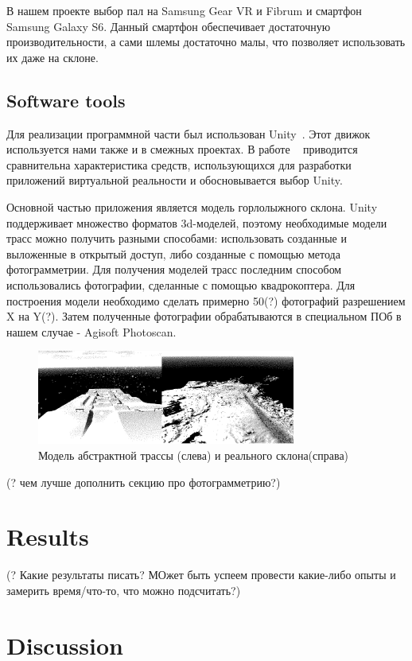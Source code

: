 \documentclass[twoside]{article}
\begin{document}
В нашем проекте выбор пал на Samsung Gear VR и Fibrum и смартфон Samsung Galaxy S6.
Данный смартфон обеспечивает достаточную производительности, а сами шлемы достаточно малы, что позволяет использовать их даже на склоне.

\subsection{Software tools}
Для реализации программной части был использован Unity~\cite{unity3d-bib9}.
Этот движок используется нами также и в смежных проектах.
В работе ~\cite{Khlamov-fruct18-bib10} приводится сравнительна характеристика средств, использующихся для разработки
приложений виртуальной реальности и обосновывается выбор Unity.

Основной частью приложения является модель горлолыжного склона.
Unity поддерживает множество форматов 3d-моделей, поэтому необходимые модели трасс можно получить разными способами:
использовать созданные и выложенные в открытый доступ, либо созданные с помощью метода фотограмметрии.
Для получения моделей трасс последним способом использовались фотографии, сделанные с помощью квадрокоптера.
Для построения модели необходимо сделать примерно 50(?) фотографий разрешением X на Y(?).
Затем полученные фотографии обрабатываются в специальном ПОб в нашем случае - Agisoft Photoscan.

\begin{figure}[h]
	\centerline{\includegraphics[width=8.5cm]{2slopes.eps}}
	\caption{Модель абстрактной трассы (слева) и реального склона(справа)}
	\label{figure:2slopes}
\end{figure}

(? чем лучше дополнить секцию про фотограмметрию?)

\section{Results}\label{results}

(? Какие результаты писать? МОжет быть успеем провести какие-либо опыты и замерить время/что-то, что можно подсчитать?)


\section{Discussion}\label{discussion}
\end{document}

